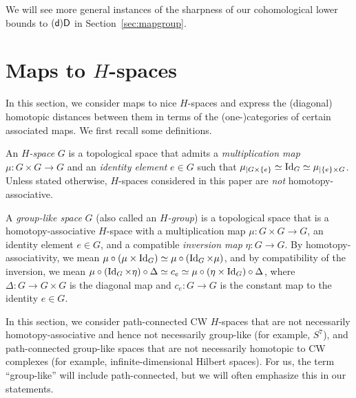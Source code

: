 \documentclass[amscd,amssymb,verbatim,10pt]{amsart}
\numberwithin{equation}{section}
\theoremstyle{plain}
\theoremstyle{definition}
\def\id{\protect\operatorname{Id}}
\newcommand{\D}{{\sf {D}}}
\newcommand{\sd}{{(\sf {d})}}
\begin{document}
We will see more general instances of the sharpness of our cohomological lower bounds to $\sd\D$ in Section~\ref{sec:mapgroup}.

\section{Maps to $H$-spaces}\label{sec: h-spaces}

In this section, we consider maps to nice $H$-spaces and express the (diagonal) homotopic distances between them in terms of the (one-)categories of certain associated maps. We first recall some definitions.

An \emph{$H$-space} $G$ is a topological space that admits a \emph{multiplication map} $\mu\colon G\times G\to G$ and an \emph{identity element} $e\in G$ such that $\mu_{|G\times\{e\}}\simeq \id_G\simeq\mu_{|\{e\}\times G}$. Unless stated otherwise, $H$-spaces considered in this paper are \emph{not} homotopy-associative.

A \emph{group-like space} $G$ (also called an \emph{$H$-group}) is a 
topological space that is a 
homotopy-associative $H$-space with a multiplication map $\mu\colon G\times G\to G$, an identity element $e\in G$, and 
a compatible \emph{inversion map} $\eta\colon G\to G$. By homotopy-associativity, we mean $\mu\circ(\mu\times \id_G)\simeq \mu\circ (\id_G\times\mu)$, and by compatibility of the inversion, we mean 
$\mu\circ(\id_G\times\eta)\circ\Delta\simeq c_e\simeq 
\mu\circ(\eta\times \id_G)\circ\Delta$, where 
$\Delta\colon G\to G\times G$ is the diagonal map and 
$c_e\colon G\to G$ is the constant map to the identity $e\in G$. 

In this section, we consider path-connected CW $H$-spaces that are not necessarily homotopy-associative and hence not necessarily group-like (for example, $S^7$), and path-connected  group-like spaces that are not necessarily homotopic to CW complexes (for example, infinite-dimensional Hilbert spaces). For
us, the term ``group-like'' will include path-connected, but we will often emphasize this in
our statements.
\end{document}
